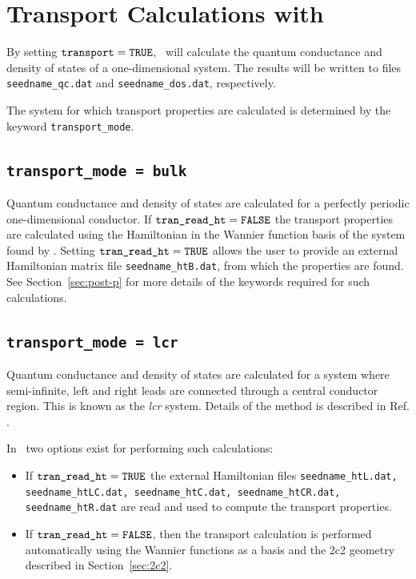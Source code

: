 \chapter{Transport Calculations with \wannier\ }\label{ch:transport}

By setting $\verb#transport#=\verb#TRUE#$, \wannier\ will calculate
the quantum conductance and density of states of a one-dimensional
system. The results will be written to files \verb#seedname_qc.dat#
and \verb#seedname_dos.dat#, respectively.

The system for which transport properties are calculated is determined
by the keyword \verb#transport_mode#.

\section{\tt transport\_mode = bulk}

Quantum conductance and density of states are calculated for a perfectly
periodic one-dimensional conductor. If $\verb#tran_read_ht#=\verb#FALSE#$
the transport properties are calculated using the Hamiltonian in the Wannier 
function basis of the system found by \wannier. Setting 
$\verb#tran_read_ht#=\verb#TRUE#$ allows the user to provide an 
external Hamiltonian matrix file {\tt seedname\_htB.dat}, from which
the properties are found. See Section~\ref{sec:post-p} for more details of 
the keywords required for such calculations.

\section{\tt transport\_mode = lcr}

Quantum conductance and density of states are calculated 
for a system where semi-infinite, left and right leads
are connected through a central conductor region. This is known 
as the \emph{lcr} system.
Details of the method is described in Ref. \cite{Nardelli}.

In \wannier\ two options exist for performing such calculations: 
\begin{itemize}
\item If $\verb#tran_read_ht#=\verb#TRUE#$ the external Hamiltonian 
files {\tt seedname\_htL.dat, seedname\_htLC.dat, seedname\_htC.dat, 
seedname\_htCR.dat, seedname\_htR.dat} are read and used to compute 
the transport properties. 
\item If $\verb#tran_read_ht#=\verb#FALSE#$, then the transport
calculation is performed automatically using the Wannier functions as a
basis and the 2c2 geometry described in Section~\ref{sec:2c2}.
\end{itemize}

